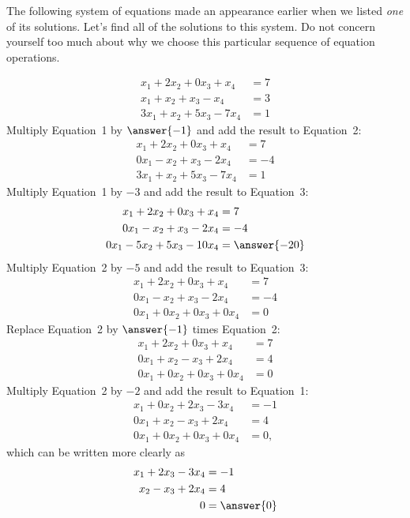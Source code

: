 \documentclass{ximera}
\begin{document}
\begin{example}
  The following system of equations made an appearance earlier when we
  listed \textit{one} of its solutions.  Let's find all of the
  solutions to this system.  Do not concern yourself too much about
  why we choose this particular sequence of equation operations.
  
  \begin{exercise}
    \begin{align*}
      x_1+2x_2 +0x_3+ x_4&= 7\\
      x_1+x_2+x_3-x_4&=3\\
      3x_1+x_2+5x_3-7x_4&=1
    \end{align*}
    Multiply Equation~1 by $\answer{-1}$ and add the result to Equation~2:
    \begin{align*}
      x_1+2x_2 +0x_3+ x_4&= 7\\
      0x_1-x_2+x_3-2x_4&=-4\\
      3x_1+x_2+5x_3-7x_4&=1
    \end{align*}
    Multiply Equation~1 by $-3$ and add the result to Equation~3:
    \begin{align*}
      x_1+2x_2 +0x_3+ x_4&= 7\\
      0x_1-x_2+x_3-2x_4&=-4\\
      0x_1-5x_2+5x_3-10x_4&=\answer{-20}
    \end{align*}
    Multiply Equation~2 by $-5$ and add the result to Equation~3:
    \begin{align*}
      x_1+2x_2 +0x_3+ x_4&= 7\\
      0x_1-x_2+x_3-2x_4&=-4\\
      0x_1+0x_2+0x_3+0x_4&=0
    \end{align*}
    Replace Equation~2 by $\answer{-1}$ times Equation~2:
    \begin{align*}
      x_1+2x_2 +0x_3+ x_4&= 7\\
      0x_1+x_2-x_3+2x_4&=4\\
      0x_1+0x_2+0x_3+0x_4&=0
    \end{align*}
    Multiply Equation~2 by $-2$ and add the result to Equation~1:
    \begin{align*}
      x_1+0x_2 +2x_3-3x_4&= -1\\
      0x_1+x_2-x_3+2x_4&=4\\
      0x_1+0x_2+0x_3+0x_4&=0,
    \end{align*}
    which can be written more clearly as
    \begin{align*}
      x_1+2x_3 - 3x_4&= -1\\
      x_2-x_3+2x_4&=4\\
      0&=\answer{0}
    \end{align*}


\end{exercise}
\end{example}
\end{document}
